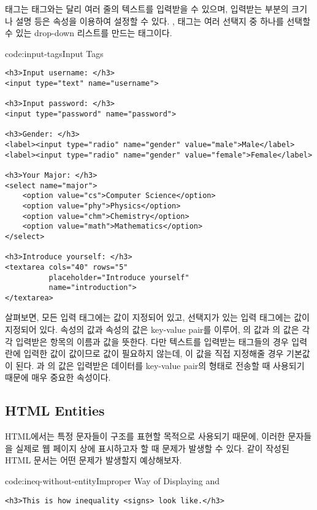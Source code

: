  태그는  태그와는 달리 여러 줄의 텍스트를 입력받을 수 있으며, 입력받는 부분의 크기나 설명 등은 속성을 이용하여 설정할 수 있다. ,  태그는 여러 선택지 중 하나를 선택할 수 있는 drop-down 리스트를 만드는 태그이다.

\begin{codeenv}{code:input-tags}{Input Tags}\begin{verbatim}
<h3>Input username: </h3>
<input type="text" name="username">

<h3>Input password: </h3>
<input type="password" name="password">

<h3>Gender: </h3>
<label><input type="radio" name="gender" value="male">Male</label>
<label><input type="radio" name="gender" value="female">Female</label>

<h3>Your Major: </h3>
<select name="major">
    <option value="cs">Computer Science</option>
    <option value="phy">Physics</option>
    <option value="chm">Chemistry</option>
    <option value="math">Mathematics</option>
</select>

<h3>Introduce yourself: </h3>
<textarea cols="40" rows="5"
          placeholder="Introduce yourself"
          name="introduction">
</textarea>
\end{verbatim}
\end{codeenv}

\를 살펴보면, 모든 입력 태그에는  값이 지정되어 있고, 선택지가 있는 입력 태그에는  값이 지정되어 있다.  속성의 값과  속성의 값은 key-value pair를 이루어, 의 값과 의 값은 각각 입력받은 항목의 이름과 값을 뜻한다. 다만 텍스트를 입력받는 태그들의 경우 입력란에 입력한 값이  값이므로  값이 필요하지 않는데, 이 값을 직접 지정해줄 경우 기본값이 된다. 과 의 값은 입력받은 데이터를 key-value pair의 형태로 전송할 때 사용되기 때문에 매우 중요한 속성이다.

\subsection*{HTML Entities}

HTML에서는 특정 문자들이 구조를 표현할 목적으로 사용되기 때문에, 이러한 문자들을 실제로 웹 페이지 상에 표시하고자 할 때 문제가 발생할 수 있다. \와 같이 작성된 HTML 문서는 어떤 문제가 발생할지 예상해보자.

\begin{codeenv}{code:ineq-without-entity}{Improper Way of Displaying \cd{<} and \cd{>}}\begin{verbatim}
<h3>This is how inequality <signs> look like.</h3>
\end{verbatim}
\end{codeenv}

